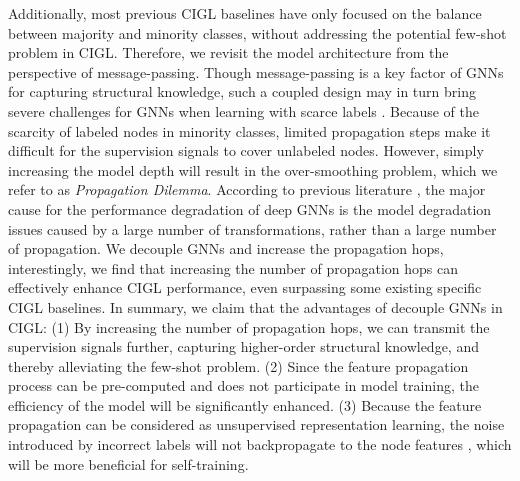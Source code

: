 Additionally, most previous CIGL baselines have only focused on the balance between majority and minority classes, without addressing the potential few-shot problem in CIGL. Therefore, we revisit the model architecture from the perspective of message-passing. Though message-passing is a key factor of GNNs for capturing structural knowledge, such a coupled design may in turn bring severe challenges for GNNs when learning with scarce labels \cite{liu2023learning}. Because of the scarcity of labeled nodes in minority classes, limited propagation steps make it difficult for the supervision signals to cover unlabeled nodes. However, simply increasing the model depth will result in the over-smoothing problem, which we refer to as \emph{Propagation Dilemma}. According to previous literature \cite{zhang2022model}, the major cause for the performance degradation of deep GNNs is the model degradation issues caused by a large number of transformations, rather than a large number of propagation. We decouple GNNs and increase the propagation hops, interestingly, we find that increasing the number of propagation hops can effectively enhance CIGL performance, even surpassing some existing specific CIGL baselines. In summary, we claim that the advantages of decouple GNNs in CIGL: (1) By increasing the number of propagation hops, we can transmit the supervision signals further, capturing higher-order structural knowledge, and thereby alleviating the few-shot problem. (2) Since the feature propagation process can be pre-computed and does not participate in model training, the efficiency of the model will be significantly enhanced. (3) Because the feature propagation can be considered as unsupervised representation learning, the noise introduced by incorrect labels will not backpropagate to the node features \cite{xue2022investigating,ding2024divide}, which will be more beneficial for self-training. 

